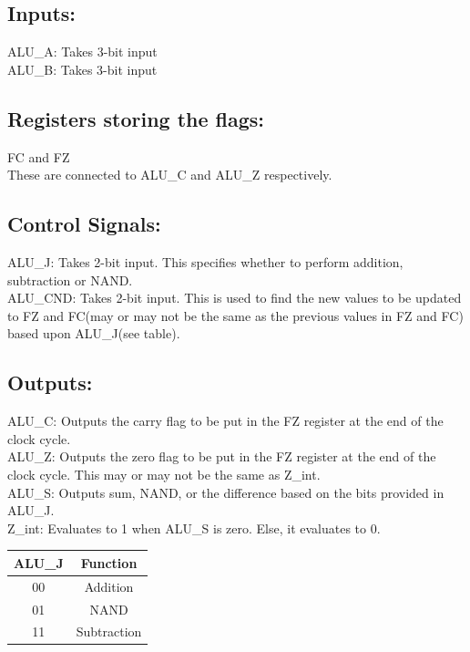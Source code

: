 \documentclass[]{report}
\begin{document}
    \subsection*{Inputs:}
    ALU\_A: Takes 3-bit input \\
    ALU\_B: Takes 3-bit input \\

    \subsection*{Registers storing the flags:}
    FC and FZ \\
    These are connected to ALU\_C and ALU\_Z respectively.

    \subsection*{Control Signals:}
    ALU\_J: Takes 2-bit input. This specifies whether to perform addition, subtraction or NAND. \\
    ALU\_CND: Takes 2-bit input. This is used to find the new values to be updated to FZ and FC(may or may not be the same as the previous values in FZ and FC) based upon ALU\_J(see table). \\

    \subsection*{Outputs:}
    ALU\_C: Outputs the carry flag to be put in the FZ register at the end of the clock cycle. \\
    ALU\_Z: Outputs the zero flag to be put in the FZ register at the end of the clock cycle. This may or may not be the same as Z\_int. \\
    ALU\_S: Outputs sum, NAND, or the difference based on the bits provided in ALU\_J. \\
    Z\_int: Evaluates to 1 when ALU\_S is zero. Else, it evaluates to 0. \\

\begin{center}
    \begin{tabular}{|c|c|}
        \hline
        ALU\_J & Function \\
        \hline
        00 & Addition \\
        \hline
        01 & NAND \\
        \hline
        11 & Subtraction \\
        \hline
    \end{tabular}
\end{center}
\end{document}
